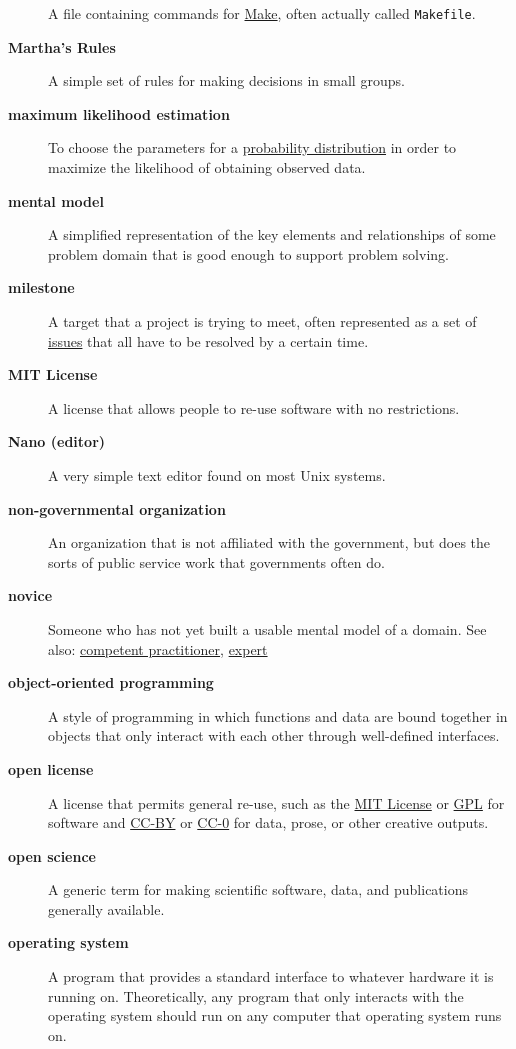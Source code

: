 \documentclass[
]{krantz}
\begin{document}
\begin{description}
A file containing commands for \protect\hyperlink{make}{Make}, often actually called \texttt{Makefile}.
\item[\textbf{Martha's Rules}]
A simple set of rules for making decisions in small groups.
\item[\textbf{maximum likelihood estimation}]
To choose the parameters for a \protect\hyperlink{probability_distribution}{probability distribution} in order to maximize the likelihood of obtaining observed data.
\item[\textbf{mental model}]
A simplified representation of the key elements and relationships of some problem domain that is good enough to support problem solving.
\item[\textbf{milestone}]
A target that a project is trying to meet, often represented as a set of \protect\hyperlink{issue}{issues} that all have to be resolved by a certain time.
\item[\textbf{MIT License}]
A license that allows people to re-use software with no restrictions.
\item[\textbf{Nano (editor)}]
A very simple text editor found on most Unix systems.
\item[\textbf{non-governmental organization}]
An organization that is not affiliated with the government, but does the sorts of public service work that governments often do.
\item[\textbf{novice}]
Someone who has not yet built a usable mental model of a domain. See also: \protect\hyperlink{competent_practitioner}{competent practitioner}, \protect\hyperlink{expert}{expert}
\item[\textbf{object-oriented programming}]
A style of programming in which functions and data are bound together in objects that only interact with each other through well-defined interfaces.
\item[\textbf{open license}]
A license that permits general re-use, such as the \protect\hyperlink{mit_license}{MIT License} or \protect\hyperlink{gpl}{GPL} for software and \protect\hyperlink{cc_by}{CC-BY} or \protect\hyperlink{cc_0}{CC-0} for data, prose, or other creative outputs.
\item[\textbf{open science}]
A generic term for making scientific software, data, and publications generally available.
\item[\textbf{operating system}]
A program that provides a standard interface to whatever hardware it is running on. Theoretically, any program that only interacts with the operating system should run on any computer that operating system runs on.

\end{description}
\end{document}
